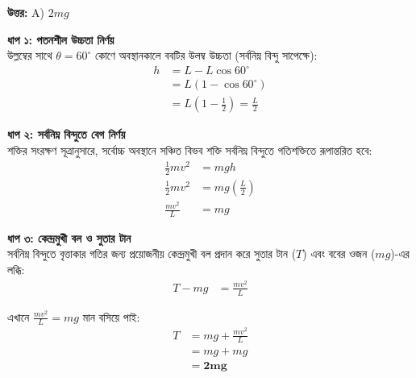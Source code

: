 \documentclass[12pt, a4paper]{article}
\begin{document}
\vspace{0.5em}
\begin{tcolorbox}[answerbox]
    \textbf{\color{success} উত্তর:} A)  $2mg$
\end{tcolorbox}
\vspace{1em}

\begin{tcolorbox}[solutionbox={সমাধান (Solution)}]
    \noindent
    \textbf{ধাপ ১: পতনশীল উচ্চতা নির্ণয়} \\
    উল্লম্বের সাথে $\theta = 60^\circ$ কোণে অবস্থানকালে ববটির উলম্ব উচ্চতা (সর্বনিম্ন বিন্দু সাপেক্ষে):
    \begin{align*}
        h &= L - L \cos 60^\circ \\
          &= L(1 - \cos 60^\circ) \\
          &= L\left(1 - \frac{1}{2}\right) = \frac{L}{2}
    \end{align*}
    
    \vspace{0.5em}
    \noindent\textbf{ধাপ ২: সর্বনিম্ন বিন্দুতে বেগ নির্ণয়} \\
    শক্তির সংরক্ষণ সূত্রানুসারে, সর্বোচ্চ অবস্থানে সঞ্চিত বিভব শক্তি সর্বনিম্ন বিন্দুতে গতিশক্তিতে রূপান্তরিত হবে:
    \begin{align*}
        \frac{1}{2} m v^2 &= mgh \\
        \frac{1}{2} m v^2 &= mg\left(\frac{L}{2}\right) \\
        \frac{m v^2}{L} &= mg
    \end{align*}
    
    \vspace{0.5em}
    \noindent\textbf{ধাপ ৩: কেন্দ্রমুখী বল ও সুতার টান} \\
    সর্বনিম্ন বিন্দুতে বৃত্তাকার গতির জন্য প্রয়োজনীয় কেন্দ্রমুখী বল প্রদান করে সুতার টান ($T$) এবং ববের ওজন ($mg$)-এর লব্ধি:
    \begin{align*}
        T - mg &= \frac{m v^2}{L}
    \end{align*}
    
    এখানে $\frac{m v^2}{L} = mg$ মান বসিয়ে পাই:
    \begin{align*}
        T &= mg + \frac{m v^2}{L} \\
          &= mg + mg \\
          &= \mathbf{2mg}
    \end{align*}
\end{tcolorbox}
\end{document}
